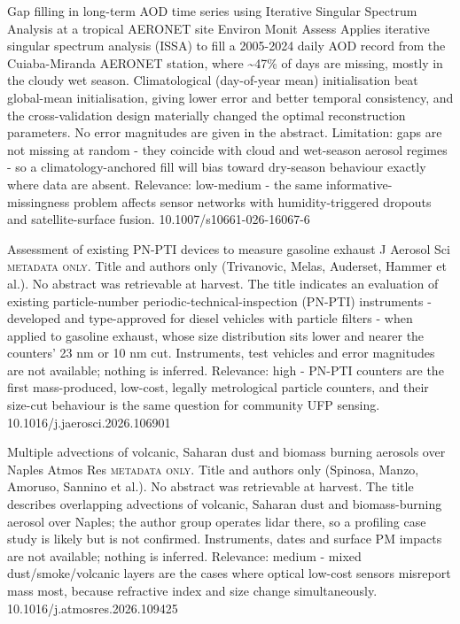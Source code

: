 \documentclass[10pt]{article}
\begin{document}
{Gap filling in long-term AOD time series using Iterative Singular Spectrum Analysis at a tropical AERONET site}
{Environ Monit Assess}
{Applies iterative singular spectrum analysis (ISSA) to fill a 2005-2024 daily AOD record from the Cuiaba-Miranda AERONET station, where \textasciitilde{}47\% of days are missing, mostly in the cloudy wet season. Climatological (day-of-year mean) initialisation beat global-mean initialisation, giving lower error and better temporal consistency, and the cross-validation design materially changed the optimal reconstruction parameters. No error magnitudes are given in the abstract. Limitation: gaps are not missing at random - they coincide with cloud and wet-season aerosol regimes - so a climatology-anchored fill will bias toward dry-season behaviour exactly where data are absent. Relevance: low-medium - the same informative-missingness problem affects sensor networks with humidity-triggered dropouts and satellite-surface fusion.}
{10.1007/s10661-026-16067-6}

{Assessment of existing PN-PTI devices to measure gasoline exhaust}
{J Aerosol Sci}
{\textsc{metadata only.} Title and authors only (Trivanovic, Melas, Auderset, Hammer et al.). No abstract was retrievable at harvest. The title indicates an evaluation of existing particle-number periodic-technical-inspection (PN-PTI) instruments - developed and type-approved for diesel vehicles with particle filters - when applied to gasoline exhaust, whose size distribution sits lower and nearer the counters' 23 nm or 10 nm cut. Instruments, test vehicles and error magnitudes are not available; nothing is inferred. Relevance: high - PN-PTI counters are the first mass-produced, low-cost, legally metrological particle counters, and their size-cut behaviour is the same question for community UFP sensing.}
{10.1016/j.jaerosci.2026.106901}

{Multiple advections of volcanic, Saharan dust and biomass burning aerosols over Naples}
{Atmos Res}
{\textsc{metadata only.} Title and authors only (Spinosa, Manzo, Amoruso, Sannino et al.). No abstract was retrievable at harvest. The title describes overlapping advections of volcanic, Saharan dust and biomass-burning aerosol over Naples; the author group operates lidar there, so a profiling case study is likely but is not confirmed. Instruments, dates and surface PM impacts are not available; nothing is inferred. Relevance: medium - mixed dust/smoke/volcanic layers are the cases where optical low-cost sensors misreport mass most, because refractive index and size change simultaneously.}
{10.1016/j.atmosres.2026.109425}
\end{document}
